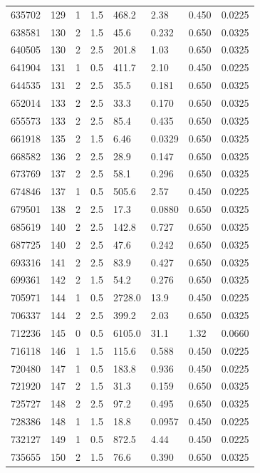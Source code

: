 \documentclass[preview]{standalone}
\begin{document}
{{{{{\begin{tabular}{L{1.2cm}C{1.2cm} C{0.3cm}C{0.5cm} C{1.4cm}C{1.4cm} C{1.4cm}C{1.4cm}}
  635702  &   129  & 1     & 1.5 &  468.2  & 2.38  & 0.450 &  0.0225   \\ 
  638581  &   130  & 2     & 1.5 &  45.6  & 0.232  & 0.650 &  0.0325   \\ 
  640505  &   130  & 2     & 2.5 &  201.8  & 1.03  & 0.650 &  0.0325   \\ 
  641904  &   131  & 1     & 0.5 &  411.7  & 2.10  & 0.450 &  0.0225   \\ 
  644535  &   131  & 2     & 2.5 &  35.5  & 0.181  & 0.650 &  0.0325   \\ 
  652014  &   133  & 2     & 2.5 &  33.3  & 0.170  & 0.650 &  0.0325   \\ 
  655573  &   133  & 2     & 2.5 &  85.4  & 0.435  & 0.650 &  0.0325   \\ 
  661918  &   135  & 2     & 1.5 &  6.46  & 0.0329  & 0.650 &  0.0325   \\ 
  668582  &   136  & 2     & 2.5 &  28.9  & 0.147  & 0.650 &  0.0325   \\ 
  673769  &   137  & 2     & 2.5 &  58.1  & 0.296  & 0.650 &  0.0325   \\ 
  674846  &   137  & 1     & 0.5 &  505.6  & 2.57  & 0.450 &  0.0225   \\ 
  679501  &   138  & 2     & 2.5 &  17.3  & 0.0880  & 0.650 &  0.0325   \\ 
  685619  &   140  & 2     & 2.5 &  142.8  & 0.727  & 0.650 &  0.0325   \\ 
  687725  &   140  & 2     & 2.5 &  47.6  & 0.242  & 0.650 &  0.0325   \\ 
  693316  &   141  & 2     & 2.5 &  83.9  & 0.427  & 0.650 &  0.0325   \\ 
  699361  &   142  & 2     & 1.5 &  54.2  & 0.276  & 0.650 &  0.0325   \\ 
  705971  &   144  & 1     & 0.5 &  2728.0  & 13.9  & 0.450 &  0.0225   \\ 
  706337  &   144  & 2     & 2.5 &  399.2  & 2.03  & 0.650 &  0.0325   \\ 
  712236  &   145  & 0     & 0.5 &  6105.0  & 31.1  & 1.32 &  0.0660   \\ 
  716118  &   146  & 1     & 1.5 &  115.6  & 0.588  & 0.450 &  0.0225   \\ 
  720480  &   147  & 1     & 0.5 &  183.8  & 0.936  & 0.450 &  0.0225   \\ 
  721920  &   147  & 2     & 1.5 &  31.3  & 0.159  & 0.650 &  0.0325   \\ 
  725727  &   148  & 2     & 2.5 &  97.2  & 0.495  & 0.650 &  0.0325   \\ 
  728386  &   148  & 1     & 1.5 &  18.8  & 0.0957  & 0.450 &  0.0225   \\ 
  732127  &   149  & 1     & 0.5 &  872.5  & 4.44  & 0.450 &  0.0225   \\ 
  735655  &   150  & 2     & 1.5 &  76.6  & 0.390  & 0.650 &  0.0325   \\ 
\hline 
\end{tabular} 

}}}}}
\end{document}
